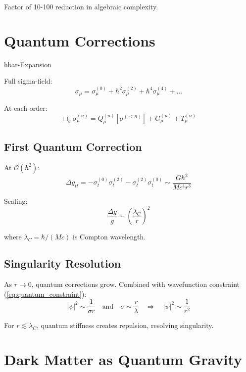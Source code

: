 \documentclass[11pt,a4paper]{article}
\theoremstyle{definition}
\theoremstyle{remark}
\begin{document}
		Factor of 10-100 reduction in algebraic complexity.
		
		\section{Quantum Corrections}
		
		hbar-Expansion
		
		Full sigma-field:
		\begin{equation}
			\sigma_\mu = \sigma_\mu^{(0)} + \hbar^2\sigma_\mu^{(2)} + \hbar^4\sigma_\mu^{(4)} + ...
		\end{equation}
		
		At each order:
		\begin{equation}
			\Box_g\sigma_\mu^{(n)} = Q_\mu^{(n)}[\sigma^{(<n)}] + G_\mu^{(n)} + T_\mu^{(n)}
		\end{equation}
		
		\subsection{First Quantum Correction}
		
		At $\mathcal{O}(\hbar^2)$:
		\begin{equation}
			\Delta g_{tt} = -\sigma_t^{(0)}\sigma_t^{(2)} - \sigma_t^{(2)}\sigma_t^{(0)} \sim \frac{G\hbar^2}{Mc^4r^3}
		\end{equation}
		
		Scaling:
		\begin{equation}
			\frac{\Delta g}{g} \sim \left(\frac{\lambda_C}{r}\right)^2
		\end{equation}
		
		where $\lambda_C = \hbar/(Mc)$ is Compton wavelength.
		
		\subsection{Singularity Resolution}
		
		As $r \to 0$, quantum corrections grow. Combined with wavefunction constraint (\ref{eq:quantum_constraint}):
		\begin{equation}
			|\psi|^2 \sim \frac{1}{\sigma r} \quad \text{and} \quad \sigma \sim \frac{r}{\lambda} \quad \Rightarrow \quad |\psi|^2 \sim \frac{1}{r^2}
		\end{equation}
		
		For $r \lesssim \lambda_C$, quantum stiffness creates repulsion, resolving singularity.
		
		\section{Dark Matter as Quantum Gravity}
		
\end{document}
